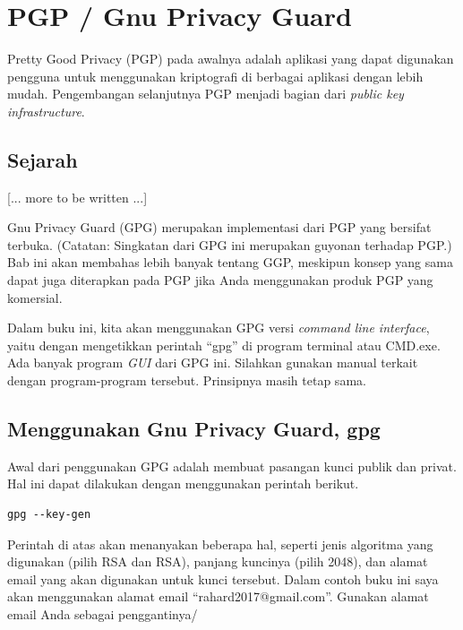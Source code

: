 \chapter{PGP / Gnu Privacy Guard}
Pretty Good Privacy (PGP) pada awalnya adalah aplikasi yang dapat digunakan
pengguna untuk menggunakan kriptografi di berbagai aplikasi dengan lebih mudah.
Pengembangan selanjutnya PGP menjadi bagian dari {\em public key
infrastructure}.

\section{Sejarah}
[... more to be written ...]

Gnu Privacy Guard (GPG) merupakan implementasi dari PGP yang bersifat terbuka.
(Catatan: Singkatan dari GPG ini merupakan guyonan terhadap PGP.) Bab ini akan
membahas lebih banyak tentang GGP, meskipun konsep yang sama dapat juga
diterapkan pada PGP jika Anda menggunakan produk PGP yang komersial.

Dalam buku ini, kita akan menggunakan GPG versi {\em command line interface},
yaitu dengan mengetikkan perintah ``gpg'' di program terminal atau CMD.exe.
Ada banyak program {\em GUI} dari GPG ini. Silahkan gunakan manual terkait
dengan program-program tersebut. Prinsipnya masih tetap sama.

\section{Menggunakan Gnu Privacy Guard, gpg}
Awal dari penggunakan GPG adalah membuat pasangan kunci publik dan privat. Hal
ini dapat dilakukan dengan menggunakan perintah berikut.

\begin{verbatim}
gpg --key-gen
\end{verbatim}

Perintah di atas akan menanyakan beberapa hal, seperti jenis algoritma yang
digunakan (pilih RSA dan RSA), panjang kuncinya (pilih 2048), dan alamat email
yang akan digunakan untuk kunci tersebut. Dalam contoh buku ini saya akan
menggunakan alamat email ``rahard2017@gmail.com''. Gunakan alamat email Anda
sebagai penggantinya/

